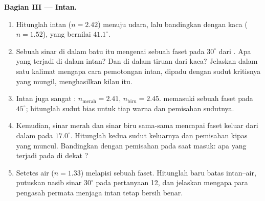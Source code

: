 \begin{problem}
\medskip
\noindent\textbf{Bagian III --- Intan.}
\begin{enumerate}[resume]
  \item Hitunglah  intan ($n = 2.42$) menuju udara, lalu
        bandingkan dengan  kaca ($n = 1.52$), yang bernilai
        $41.1^\circ$.
  \item Sebuah sinar di dalam batu itu mengenai sebuah faset pada
        $30^\circ$ dari . Apa yang terjadi di dalam
        intan? Dan di dalam tiruan dari kaca? Jelaskan dalam satu
        kalimat mengapa cara pemotongan intan, dipadu dengan sudut
        kritisnya yang mungil, menghasilkan kilau itu.
  \item Intan juga sangat : $n_{\text{merah}} = 2.41$,
        $n_{\text{biru}} = 2.45$.  memasuki sebuah faset
        pada $45^\circ$; hitunglah sudut bias untuk tiap warna dan
        pemisahan sudutnya.
  \item Kemudian, sinar merah dan sinar biru sama-sama mencapai faset
        keluar dari dalam pada $17.0^\circ$. Hitunglah kedua sudut
        keluarnya dan pemisahan kipas yang muncul. Bandingkan dengan
        pemisahan pada saat masuk: apa yang terjadi pada  di
        dekat ?
  \item Setetes air ($n = 1.33$) melapisi sebuah faset. Hitunglah  baru batas intan--air, putuskan nasib sinar $30^\circ$
        pada pertanyaan 12, dan jelaskan mengapa para pengasah permata
        menjaga intan tetap bersih benar.
\end{enumerate}


\end{problem}
